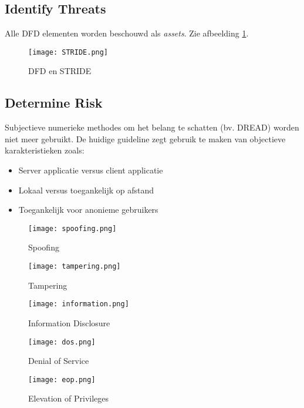 \documentclass[../main.tex]{subfiles}
\begin{document}
\subsection{Identify Threats}
Alle DFD elementen worden beschouwd als \textit{assets}. Zie afbeelding \ref{f:STRIDE}.
\begin{figure}[H]
    \centering
    \texttt{[image: STRIDE.png]}
    \caption{DFD en STRIDE}
    \label{f:STRIDE}
\end{figure}
\subsection{Determine Risk}
Subjectieve numerieke methodes om het belang te schatten (bv. DREAD) worden niet meer gebruikt. De huidige guideline zegt gebruik te maken van objectieve karakteristieken zoals:
\begin{itemize}
	\item Server applicatie versus client applicatie
	\item Lokaal versus toegankelijk op afstand
	\item Toegankelijk voor anonieme gebruikers
\end{itemize}

\begin{figure}[H]
    \centering
    \texttt{[image: spoofing.png]}
    \caption{Spoofing}
    \label{spoofing}
\end{figure}

\begin{figure}[H]
    \centering
    \texttt{[image: tampering.png]}
    \caption{Tampering}
    \label{tampering}
\end{figure}

\begin{figure}[H]
    \centering
    \texttt{[image: information.png]}
    \caption{Information Disclosure}
    \label{information}
\end{figure}

\begin{figure}[H]
    \centering
    \texttt{[image: dos.png]}
    \caption{Denial of Service}
    \label{dos}
\end{figure}

\begin{figure}[H]
    \centering
    \texttt{[image: eop.png]}
    \caption{Elevation of Privileges}
    \label{eop}
\end{figure}
\end{document}
